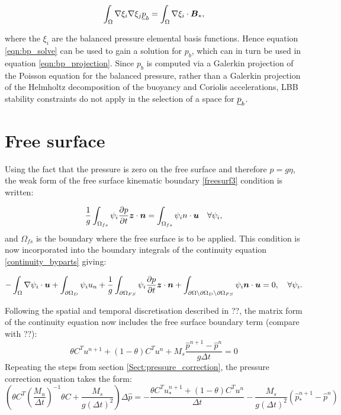 \begin{equation}\label{eqn:bp_solve}
  \int_\Omega \nabla \xi_i \nabla \xi_j \underline{p}_b = \int_\Omega \nabla \xi_i \cdot {\mbox{\boldmath$B$}}_*,
\end{equation}

where the $\xi_i$ are the balanced pressure elemental basis functions. Hence equation
\eqref{eqn:bp_solve} can be used to gain a solution for $p_b$, which can in turn
be used in equation \eqref{eqn:bp_projection}. Since $p_b$ is computed via
a Galerkin projection of the Poisson equation for the balanced pressure,
rather than a Galerkin projection of the Helmholtz decomposition of the buoyancy
and Coriolis accelerations, LBB stability constraints do not apply in the selection
of a space for $\underline{p}_b$.

\section{Free surface}

Using the fact that the pressure is zero on the free surface and therefore $p=g\eta$, the weak form of the free surface kinematic boundary \eqref{freesurf3} condition is written:

\begin{equation}\label{weakfreesurf3}
\frac{1}{g} \int_{\Omega_{fs}} {\psi_i }\frac{\partial p}{\partial t}{\mbox{\boldmath$z$}} \cdot {\mbox{\boldmath$n$}}=\int_{\Omega_{fs}} \psi_i {n \cdot {\mbox{\boldmath$u$}}} \quad
  \forall \psi_i,
\end{equation}
and $\Omega_{fs}$ is the boundary where the free surface is to be applied. This condition is now incorporated into the boundary integrals of the continuity equation \eqref{continuity_byparts} giving:

\begin{equation}\label{continuity_byparts_withfs}
  -\int_\Omega \nabla\psi_i \cdot {\mbox{\boldmath$u$}}
  + \int_{\partial\Omega_D} \psi_i u_n
  + \frac{1}{g} \int_{\partial\Omega_{FS}}  {\psi_i }\frac{\partial p}{\partial t}{\mbox{\boldmath$z$}} \cdot {\mbox{\boldmath$n$}}
  + \int_{\partial\Omega\setminus\partial\Omega_D\setminus\partial\Omega_{FS}} \psi_i{\mbox{\boldmath$n$}}\cdot {\mbox{\boldmath$u$}}
  = 0,\quad
  \forall \psi_i.
\end{equation}

Following the spatial and temporal discretisation described in ??, the matrix form of the continuity equation now includes the free surface boundary term (compare with ??):
\begin{equation}
\theta C^T u^{n+1} + (1-\theta) C^T u^n + M_s \frac{\hat p^{n+1}-\hat p^n}{g \Delta t}=0
\end{equation}
Repeating the steps from section \ref{Sect:pressure_correction}, the pressure correction equation takes the form:
\begin{equation}
\left(\theta C^T(\frac{M_u}{\Delta t})^{-1} \theta C + \frac{M_s}{g(\Delta t)^2}\right)\Delta \hat p = -\frac{\theta C^T u_*^{n+1} + (1-\theta)C^Tu^n}{\Delta t}-\frac{M_s}{g(\Delta t)^2}(\hat p_*^{n+1}-\hat p^n)
\end{equation}


